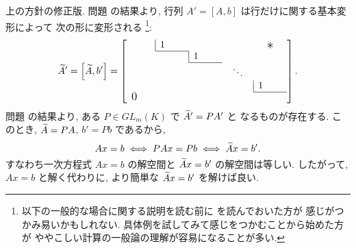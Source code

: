 \documentclass[12pt,twoside]{jarticle}
\begin{document}
上の方針の修正版. 
問題  の結果より, 行列 $A'=[A,b]$ は行だけに関する基本変形によって
次の形に変形される%
\footnote{以下の一般的な場合に関する説明を読む前に
  を読んでおいた方が
  感じがつかみ易いかもしれない.  
  具体例を試してみて感じをつかむことから始めた方が
  ややこしい計算の一般論の理解が容易になることが多い.}:
\begin{equation*}
  \tA' 
  = \left[\tA,b'\right]
  =
  \left[
    \begin{array}{ccccc}
      \multicolumn{1}{c|}{\qquad} & 1 \qquad & & & \bigstaru \\
      \cline{2-2}
      \multicolumn{2}{c|}{} & 1 \qquad & & \\
      \cline{3-3}
      \multicolumn{3}{c}{} & \;\;\ddots\;\; & \\
      \multicolumn{4}{c|}{} & 1 \qquad \\
      \cline{5-5}
      \multicolumn{5}{l}{\bigzerol} \\
    \end{array}
  \right]. 
\end{equation*}
問題  の結果より, ある $P\in GL_m(K)$ で ${\widetilde A}'=PA'$ と
なるものが存在する. このとき, ${\widetilde A}=PA$, $b'=Pb$ であるから,
\begin{equation*}
  Ax = b \iff PAx = Pb \iff {\widetilde A} x = b'.
\end{equation*}
すなわち一次方程式 $Ax=b$ の解空間と ${\widetilde A} x=b'$ の解空間は等しい.
したがって, $Ax=b$ と解く代わりに, より簡単な ${\widetilde A} x=b'$ を解けば良い.

\end{document}
